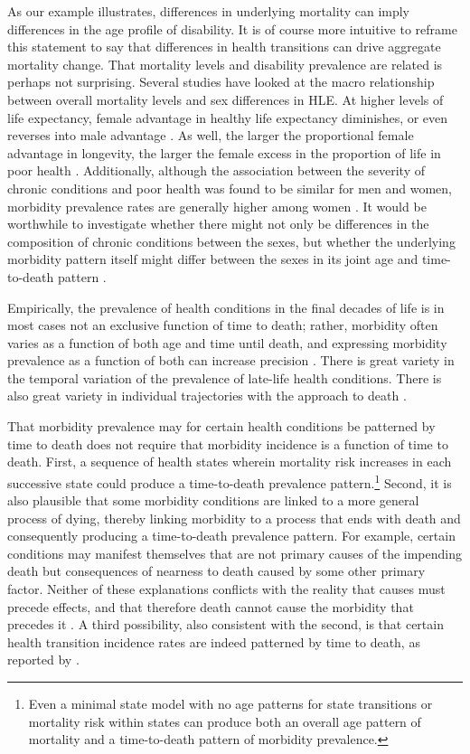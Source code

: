 \documentclass[12pt,oneside,a4paper]{article} %
\begin{document}
As our example illustrates, differences
in underlying mortality can imply differences in the age profile of
disability. It is of course more intuitive to reframe this statement to say that differences in health transitions can drive aggregate mortality change. That mortality levels and disability prevalence
are related is perhaps not surprising. Several studies have looked at the macro relationship between overall mortality
levels and sex differences in HLE. At higher levels of life expectancy, female
advantage in healthy life expectancy diminishes, or even reverses into male
advantage \citep{vanOyen2013}. As well, the larger the proportional female
advantage in longevity, the larger the female excess in the proportion of life
in poor health \citep{Luy2014}. 
Additionally, although the association between the severity of chronic conditions and poor health was found
to be similar for men and women, morbidity prevalence rates are generally higher
among women \citep{Case2005}. It
would be worthwhile to investigate whether there might not only be differences
in the composition of chronic conditions between the sexes, but whether the
underlying morbidity pattern itself might differ between the sexes in its joint
age and time-to-death pattern \citep{riffe2017ttd}.

Empirically, the prevalence of health conditions in the final decades of life is in most cases not an exclusive function of time to death; rather, morbidity often varies as a function of
both age and time until death, and expressing morbidity prevalence
as a function of both can increase precision
\citep{klijs2011future, riffe2017ttd}.
There is great variety in the temporal variation of the prevalence of late-life
health conditions. There is also great variety in individual trajectories with
the approach to death \citep{lunney2003patterns}. 

That morbidity prevalence may for certain health conditions be patterned by
time to death does not require that morbidity incidence is a function
of time to death. First, a sequence of health states wherein
mortality risk increases in each successive state could produce a time-to-death
prevalence pattern.\footnote{Even a minimal state model with no age patterns for state transitions or mortality risk within states can produce both an overall age pattern of mortality and a time-to-death pattern of morbidity prevalence.} Second, it is also
plausible that some morbidity conditions are linked to a more general process of dying, thereby
linking morbidity to a process that ends with death and consequently producing a
time-to-death prevalence pattern. For example, certain conditions may manifest
themselves that are not primary causes of the impending death but
consequences of nearness to death caused by some other primary factor.
Neither of these explanations conflicts with the reality that causes must
precede effects, and that therefore death cannot cause the morbidity that precedes it \citep{lynch2015commentary}. A third possibility, also consistent with the second, is that certain health transition incidence rates are indeed patterned by time to death, as reported by \citet{klijs2010disability}.
\end{document}
